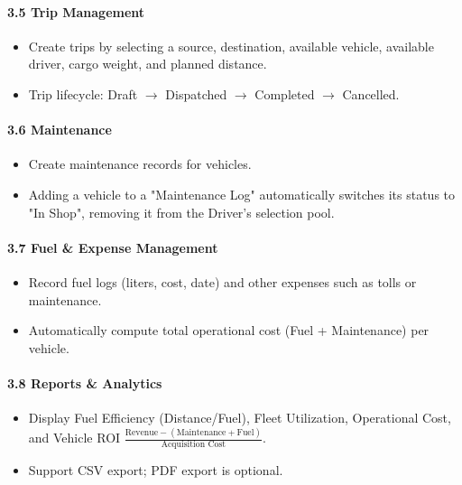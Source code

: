 \documentclass{article}
\begin{document}
\paragraph*{3.5 Trip Management}
\begin{itemize}
    \item Create trips by selecting a source, destination, available vehicle, available driver, cargo weight, and planned distance.
    \item Trip lifecycle: Draft $\rightarrow$ Dispatched $\rightarrow$ Completed $\rightarrow$ Cancelled.
\end{itemize}

\paragraph*{3.6 Maintenance}
\begin{itemize}
    \item Create maintenance records for vehicles.
    \item Adding a vehicle to a "Maintenance Log" automatically switches its status to "In Shop", removing it from the Driver's selection pool.
\end{itemize}

\paragraph*{3.7 Fuel \& Expense Management}
\begin{itemize}
    \item Record fuel logs (liters, cost, date) and other expenses such as tolls or maintenance.
    \item Automatically compute total operational cost (Fuel + Maintenance) per vehicle.
\end{itemize}

\paragraph*{3.8 Reports \& Analytics}
\begin{itemize}
    \item Display Fuel Efficiency (Distance/Fuel), Fleet Utilization, Operational Cost, and Vehicle ROI $\frac{\text{Revenue} - (\text{Maintenance} + \text{Fuel})}{\text{Acquisition Cost}}$.
    \item Support CSV export; PDF export is optional.
\end{itemize}

\newpage
\end{document}
